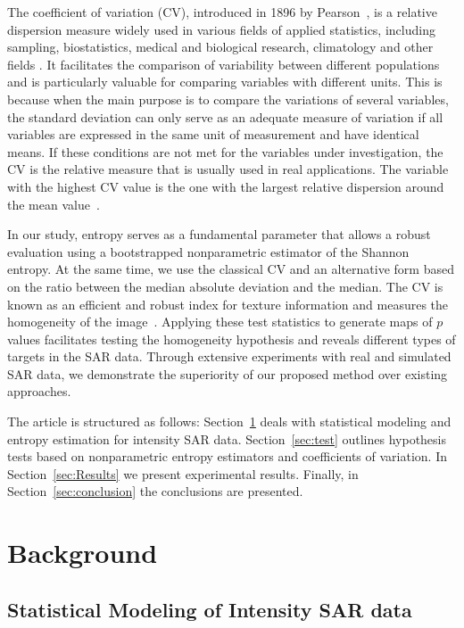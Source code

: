 \documentclass[remotesensing,article,submit,moreauthors,pdftex]{Definitions/mdpi}
\begin{document}
The coefficient of variation (CV), introduced in 1896 by Pearson~\cite{Pearson1896}, is a relative dispersion measure widely used in various fields of applied statistics, including sampling, biostatistics, medical and biological research, climatology and other fields
\cite{hendricks1936sampling, Tian2005,SubrahmanyaNairy2003,Chankham2024}.
It facilitates the comparison of variability between different populations and is particularly valuable for comparing variables with different units. This is because when the main purpose is to compare the variations of several variables, the standard deviation can only serve as an adequate measure of variation if all variables are expressed in the same unit of measurement and have identical means. If these conditions are not met for the variables under investigation, the CV is the relative measure that is usually used in real applications. The variable with the highest CV value is the one with the largest relative dispersion around the mean value~\cite{Banik2011}.

In our study, entropy serves as a fundamental parameter that allows a robust evaluation using a bootstrapped nonparametric estimator of the
Shannon entropy.
At the same time, we use the classical CV and an alternative form based on the ratio between the median absolute deviation and the median. 
The CV is known as an efficient and robust index for texture information and measures the homogeneity of the image~\cite{Lopes1990}.
Applying these test statistics to generate maps of \(p\) values facilitates testing the homogeneity hypothesis and reveals different types of targets in the SAR data. 
Through extensive experiments with real and simulated SAR data, we demonstrate the superiority of our proposed method over existing approaches.

The article is structured as follows: Section~\ref{sec:Background}
deals with statistical modeling and entropy estimation for intensity SAR
data. Section~\ref{sec:test} outlines hypothesis tests based on nonparametric entropy estimators and coefficients of variation. In
Section~\ref{sec:Results} we present experimental results. Finally, in
Section~\ref{sec:conclusion} the conclusions are presented.

\hypertarget{sec:Background}{%
\section{Background}\label{sec:Background}}

\hypertarget{statistical-modeling-of-intensity-sar-data}{%
\subsection{Statistical Modeling of Intensity SAR
data}\label{statistical-modeling-of-intensity-sar-data}}
\end{document}
